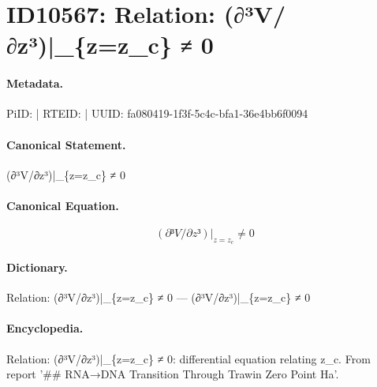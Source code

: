 \section*{ID10567: Relation: (∂³V/∂z³)|\_\{z=z\_c\} ≠ 0}
\paragraph{Metadata.}
PiID:  | RTEID:  | UUID: fa080419-1f3f-5c4c-bfa1-36e4bb6f0094

\paragraph{Canonical Statement.}
(∂³V/∂z³)|\_\{z=z\_c\} ≠ 0

\paragraph{Canonical Equation.}
\[
(∂³V/∂z³)|_{z=z_c} ≠ 0
\]

\paragraph{Dictionary.}
Relation: (∂³V/∂z³)|\_\{z=z\_c\} ≠ 0 — (∂³V/∂z³)|\_\{z=z\_c\} ≠ 0

\paragraph{Encyclopedia.}
Relation: (∂³V/∂z³)|\_\{z=z\_c\} ≠ 0: differential equation relating z\_c. From report '\#\# RNA→DNA Transition Through Trawin Zero Point Ha'.
